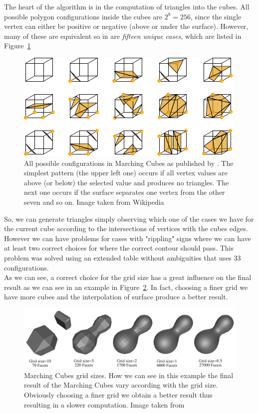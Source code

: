 The heart of the algorithm is in the computation of triangles into the cubes. All possible polygon configurations inside the cubes are $2^{8} = 256$, since the single vertex can either be positive or negative (above or under the surface). However, many of these are equivalent so in \cite{Lorensen} are \textit{fifteen unique cases}, which are listed in Figure~\ref{fig:MarchingCubesCases}

\begin{figure}[htb] %
   \centering
   \includegraphics[width=0.60\linewidth]{images/MarchingCubes.pdf}
   \caption[All possible configurations in Marching Cubes]{All possible configurations in Marching Cubes as published by \cite{Lorensen}. The simplest pattern (the upper left one) occurs if all vertex values are above (or below) the selected value and produces no triangles. The next one occurs if the surface separates one vertex from the other seven and so on. Image taken from Wikipedia}
   \label{fig:MarchingCubesCases}
\end{figure}

So, we can generate triangles simply observing which one of the cases we have for the current cube according to the intersections of vertices with the cubes edges. However we can have problems for cases with "rippling" signs where we can have at least two correct choices for where the correct contour should pass. This problem was solved using an extended table without ambiguities that uses 33 configurations.\\

As we can see, a correct choice for the grid size has a great influence on the final result as we can see in an example in Figure~\ref{fig:MarchingGrid}. In fact, choosing a finer grid we have more cubes and the interpolation of surface produce a better result.

\begin{figure}[htb] %
   \centering
   \includegraphics[width=0.90\linewidth]{images/polygoniseMarching.pdf}
   \caption[Marching Cubes grid sizes]{Marching Cubes grid sizes. How we can see in this example the final result of the Marching Cubes vary according with the grid size. Obviously choosing a finer grid we obtain a better result thus resulting in a slower computation. Image taken from \cite{Bourke}}
   \label{fig:MarchingGrid}
\end{figure}

